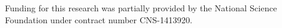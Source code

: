 
Funding for this research was partially provided by the National Science Foundation under contract number \mbox{CNS-1413920}.
